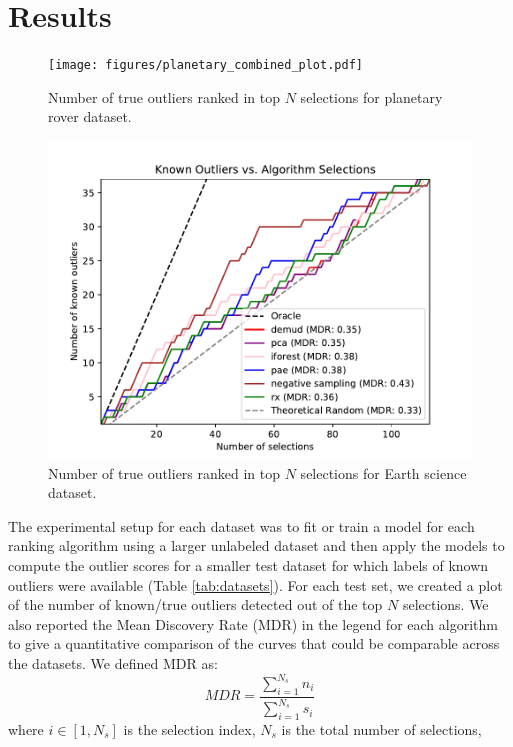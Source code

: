 \documentclass[letterpaper]{article} %
\begin{document}
\section{Results}
\begin{figure}
    \centering
    \texttt{[image: figures/planetary\_combined\_plot.pdf]}
    \caption{Number of true outliers ranked in top $N$ selections for 
    planetary rover dataset.}
    \label{fig:planetary_results}
\end{figure}
\begin{figure}
    \centering
    \includegraphics[width=\linewidth]{figures/faw_combined_plot.pdf}
    \caption{Number of true outliers ranked in top $N$ selections for 
    Earth science dataset.}
    \label{fig:faw_results}
\end{figure}
The experimental setup for each dataset was to fit or train a model for
each ranking algorithm using a larger unlabeled dataset and then apply 
the models to compute the outlier scores for a smaller test dataset for which
labels of known outliers were available (Table \ref{tab:datasets}). 
For each test set, we created a plot of the number of known/true outliers 
detected out of the top $N$ selections. We also 
reported the Mean Discovery Rate (MDR) in the legend
for each algorithm to give a quantitative comparison of the curves that could
be comparable across the datasets. We defined MDR as:
\begin{equation}
MDR = \frac{\sum^{N_s}_{i=1} n_i}{\sum^{N_s}_{i=1} s_i}
\end{equation}
where $i \in [1, N_s]$ is the selection index,
 $N_s$ is the total number of selections,
\end{document}
